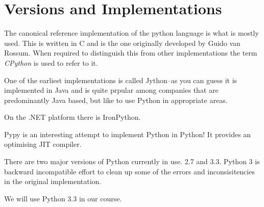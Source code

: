 \documentclass[11pt,a4paper]{article}
\begin{document}
\section*{Versions and Implementations}
The canonical reference implementation of the python language is what is mostly used. This is written in C and is the one originally developed by Guido van Rossum. When required to distinguish this from other implementations the term \emph{CPython} is used to refer to it.

One of the earliest implementations is  called Jython--as you can guess it is implemented in Java and is quite prpular among companies that are predominantly Java based, but like to use Python in appropriate areas.

On the .NET platform there is IronPython. 

Pypy is an interesting attempt to implement Python in Python! It provides an optimising JIT compiler.

There are two major versions of Python currently in use. 2.7 and 3.3. Python 3 is backward incompatible effort to clean up some of the errors and inconsisitencies in the original implementation. 

We will use Python 3.3 in our course.
\end{document}
